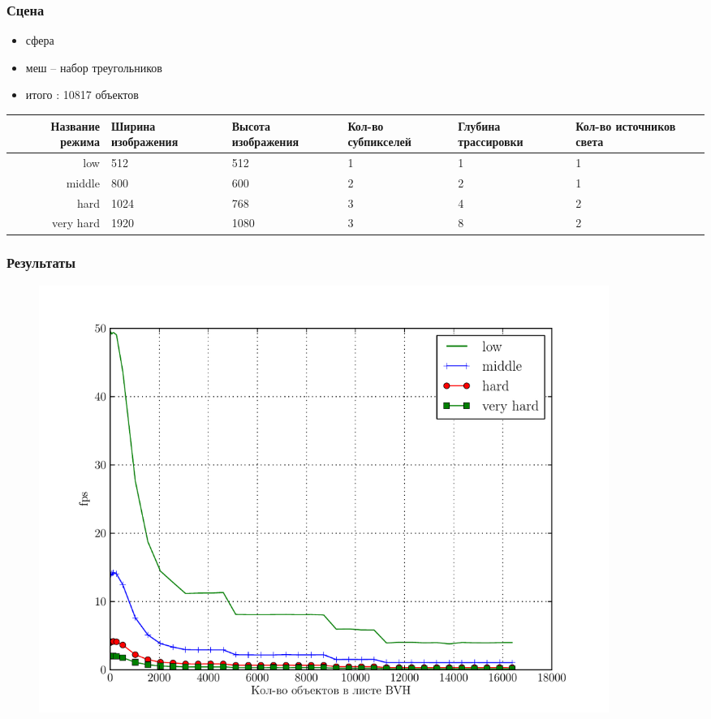 \documentclass[utf8, 12pt]{beamer}
\begin{document}
\begin{frame}
\frametitle{Сцена}
\begin{itemize}
\item сфера
\item меш -- набор треугольников 
\item итого : 10817 объектов
\end{itemize}

\def\lllen{1.20cm}
\begin{center}
{\noindent \scriptsize
\begin{tabular}{|r|p{\lllen}|p{\lllen}|p{\lllen}|p{\lllen}|p{\lllen}|}
\hline
Название режима & Ширина изображения &  Высота изображения  & Кол-во субпикселей & Глубина трассировки & Кол-во источников света \\  \hline
low       & 512  & 512  & 1 & 1 & 1 \\ \hline
middle    & 800  & 600  & 2 & 2 & 1 \\ \hline
hard      & 1024 & 768  & 3 & 4 & 2 \\ \hline
very hard & 1920 & 1080 & 3 & 8 & 2 \\ \hline
\end{tabular}
}
\end{center}
\end{frame}

\begin{frame}
\frametitle{Результаты}
\begin{figure}[H]
\centering
\includegraphics[width=0.9\textwidth]{perf/performance_bvh.pdf}
\end{figure}

\end{frame}
\end{document}
